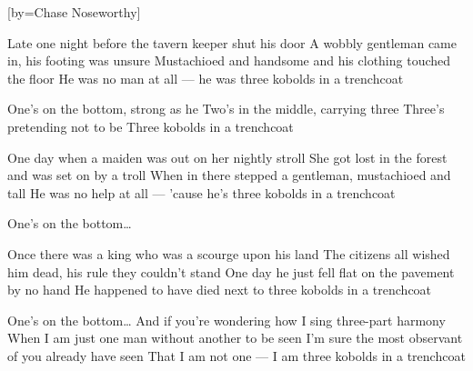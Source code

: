


[by=Chase Noseworthy]

\beginverse*
{\nolyrics Jam chart (approx.): \[G] \[Em] \[C] \[D] \quad (Loop)}
\endverse

\beginverse
Late one night before the tavern keeper shut his door
A wobbly gentleman came in, his footing was unsure
Mustachioed and handsome and his clothing touched the floor
He was no man at all --- he was three kobolds in a trenchcoat
\endverse

\beginchorus
One's on the bottom, strong as he \brk  Two's in the middle, carrying three
Three's pretending not to be \brk  Three kobolds in a trenchcoat
\endchorus

\beginverse
One day when a maiden was out on her nightly stroll
She got lost in the forest and was set on by a troll
When in there stepped a gentleman, mustachioed and tall
He was no help at all --- 'cause he's three kobolds in a trenchcoat
\endverse

\beginchorus
{} One's on the bottom\ldots
\endchorus

\beginverse
Once there was a king who was a scourge upon his land
The citizens all wished him dead, his rule they couldn't stand
One day he just fell flat on the pavement by no hand
He happened to have died next to three kobolds in a trenchcoat
\endverse

\beginchorus
{} One's on the bottom\ldots
And if you're wondering how I sing three-part harmony
When I am just one man without another to be seen
I'm sure the most observant of you already have seen
That I am not one --- I am three kobolds in a trenchcoat
\endchorus

\endsong
